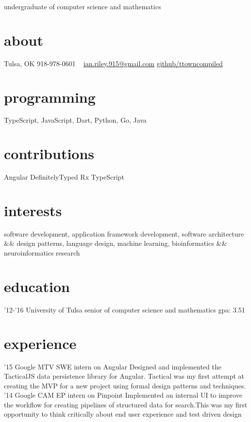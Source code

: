 \documentclass[]{friggeri-cv}
\begin{document}
       {undergraduate of computer science and mathematics}


\begin{aside}
  \section{about}
    Tulsa, OK
    918-978-0601
    ~
    \href{mailto:ian.riley.915@gmail.com}{ian.riley.915@gmail.com}
    \href{https://github.com/ttowncompiled}{github/ttowncompiled}
  \section{programming}
    TypeScript, JavaScript, Dart, Python, Go, Java
  \section{contributions}
    Angular
    DefinitelyTyped
    Rx
    TypeScript
\end{aside}

\section{interests}
software development, application framework development, software architecture \&\& design patterns, language design, machine learning, bioinformatics \&\& neuroinformatics research

\section{education}

\begin{entrylist}
  \entry
    {'12-'16}
    {University of Tulsa}
    {senior of computer science and mathematics}
    {gpa: 3.51}
\end{entrylist}

\section{experience}

\begin{entrylist}
  \entry
    {'15}
    {Google MTV}
    {SWE intern on Angular}
    {Designed and implemented the TacticalJS data persistence library for Angular. Tactical was my first attempt at creating the MVP for a new project using formal design patterns and techniques.}
  \entry
    {'14}
    {Google CAM}
    {EP intern on Pinpoint}
    {Implemented an internal UI to improve the workflow for creating pipelines of structured data for search.This was my first opportunity to think critically about end user experience and test driven design}
\end{entrylist}
\end{document}
